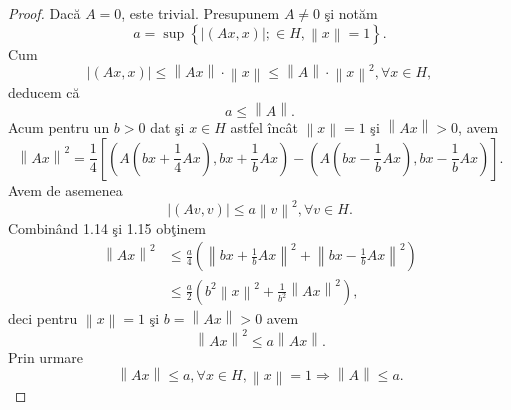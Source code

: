 \documentclass[a4paper,12pt,oneside]{report}
\begin{document}
\begin{proof}
Dac\u{a} \(A = 0\), este trivial. Presupunem \(A\neq 0\) \c{s}i not\u{a}m
\begin{displaymath}
  a = \sup \left \{ \left | \left ( Ax,x \right ) \right |; \in H , \left \| x \right \| = 1\right \}.
\end{displaymath}
Cum
\begin{displaymath}
  \left | \left ( Ax,x \right ) \right | \leq  \left \| Ax \right \| \cdot \left \| x \right \| \leq  \left \| A \right \| \cdot   \left \| x \right \|^{2}, \forall x \in H,
\end{displaymath}
deducem c\u{a}
\begin{displaymath}
  a \leq  \left \| A \right \|. \label{eq:1.13} \tag{1.13}
\end{displaymath}
Acum pentru un \(b> 0\) dat \c{s}i \( x \in H\) astfel \^{i}nc\^{a}t \(\left \| x \right \|=1\) \c{s}i \(\left \| Ax \right \| > 0\), avem
\begin{displaymath}
  \left \| Ax \right \|^{2} = \frac{1}{4}\left [ \left ( A\left ( bx + \frac{1}{4}Ax\right ),bx + \frac{1}{b} Ax\right ) - \left ( A\left ( bx - \frac{1}{b} Ax \right ), bx - \frac{1}{b}Ax \right )\right ]. \label{eq:1.14} \tag{1.14}
\end{displaymath}
Avem de asemenea
\begin{displaymath}
  \left | \left ( Av,v \right ) \right |\leq a \left \| v \right \|^{2}, \forall v \in H. \label{eq:1.15} \tag{1.15}
\end{displaymath}
Combin\^{a}nd 1.14 \c{s}i 1.15 ob\c{t}inem
\begin{equation}\nonumber
    \begin{split}
        \left \| Ax \right \|^{2} & \leq \frac{a}{4}\left ( \left \| bx + \frac{1}{b}Ax \right \| ^{2} + \left \| bx - \frac{1}{b}Ax \right \| ^{2} \right ) \\ & \leq \frac{a}{2}\left ( b^{2}\left \| x \right \|^{2} + \frac{1}{b^{2}} \left \| Ax \right \|^{2}\right ),
    \end{split}
\end{equation}
deci pentru \(\left \| x \right \| = 1\) \c{s}i \(b = \left \| Ax \right \| > 0\) avem
\begin{displaymath}
  \left \| Ax \right \|^{2} \leq  a\left \| Ax \right \|.
\end{displaymath}
Prin urmare
\begin{displaymath}
  \left \| Ax \right \| \leq a, \forall x \in H, \left \| x \right \| = 1 \Rightarrow \left \| A  \right \|\leq a.
\end{displaymath}
\end{proof}
\end{document}
